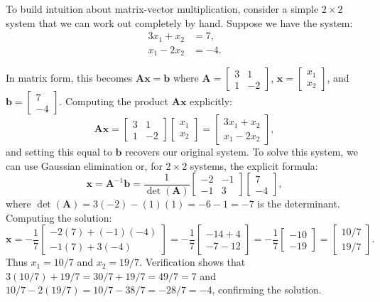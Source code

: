 To build intuition about matrix-vector multiplication, consider a simple $2 \times 2$ system that we can work out completely by hand. Suppose we have the system:
\[
\begin{aligned}
3x_1 + x_2 &= 7, \\
x_1 - 2x_2 &= -4.
\end{aligned}
\]

In matrix form, this becomes $\mathbf{A}\mathbf{x} = \mathbf{b}$ where $\mathbf{A} = \begin{bmatrix} 3 & 1 \\ 1 & -2 \end{bmatrix}$, $\mathbf{x} = \begin{bmatrix} x_1 \\ x_2 \end{bmatrix}$, and $\mathbf{b} = \begin{bmatrix} 7 \\ -4 \end{bmatrix}$. Computing the product $\mathbf{A}\mathbf{x}$ explicitly:
\[
\mathbf{A}\mathbf{x} = \begin{bmatrix} 3 & 1 \\ 1 & -2 \end{bmatrix} \begin{bmatrix} x_1 \\ x_2 \end{bmatrix} = \begin{bmatrix} 3x_1 + x_2 \\ x_1 - 2x_2 \end{bmatrix},
\]
and setting this equal to $\mathbf{b}$ recovers our original system. To solve this system, we can use Gaussian elimination or, for $2 \times 2$ systems, the explicit formula:
\[
\mathbf{x} = \mathbf{A}^{-1}\mathbf{b} = \frac{1}{\det(\mathbf{A})} \begin{bmatrix} -2 & -1 \\ -1 & 3 \end{bmatrix} \begin{bmatrix} 7 \\ -4 \end{bmatrix},
\]
where $\det(\mathbf{A}) = 3(-2) - (1)(1) = -6 - 1 = -7$ is the determinant. Computing the solution:
\[
\mathbf{x} = -\frac{1}{7} \begin{bmatrix} -2(7) + (-1)(-4) \\ -1(7) + 3(-4) \end{bmatrix} = -\frac{1}{7} \begin{bmatrix} -14 + 4 \\ -7 - 12 \end{bmatrix} = -\frac{1}{7} \begin{bmatrix} -10 \\ -19 \end{bmatrix} = \begin{bmatrix} 10/7 \\ 19/7 \end{bmatrix}.
\]
Thus $x_1 = 10/7$ and $x_2 = 19/7$. Verification shows that $3(10/7) + 19/7 = 30/7 + 19/7 = 49/7 = 7$ and $10/7 - 2(19/7) = 10/7 - 38/7 = -28/7 = -4$, confirming the solution.

